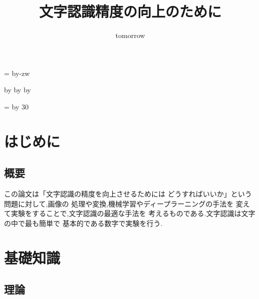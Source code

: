 \documentclass[12pt, a4paper, titlepage]{jarticle}
\title{文字認識精度の向上のために}
\author{tomorrow}
\date{}
\makeatletter
\def\mojiparline#1{
	\newcounter{mpl}
	\setcounter{mpl}{#1}
	\@tempdima=\linewidth
	\advance\@tempdima by-\value{mpl}zw
	\addtocounter{mpl}{-1}
	\divide\@tempdima by \value{mpl}
	\advance\kanjiskip by\@tempdima
	\advance\parindent by\@tempdima
}
\def\linesparpage#1{
	\baselineskip=\textheight
	\divide\baselineskip by #1
	}
\makeatother
\begin{document}
	\maketitle
	\mojiparline{35}
	\linesparpage{30}

	\tableofcontents
	\clearpage

	\section{はじめに}
		\subsection{概要}
			この論文は「文字認識の精度を向上させるためには
			どうすればいいか」という問題に対して,画像の
			処理や変換,機械学習やディープラーニングの手法を
			変えて実験をすることで,文字認識の最適な手法を
			考えるものである.文字認識は文字の中で最も簡単で
			基本的である数字で実験を行う.
	\section{基礎知識}
		\subsection{理論}
\end{document}
